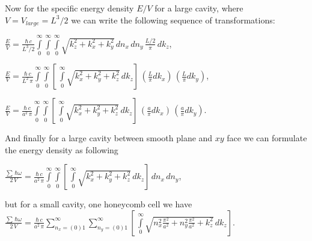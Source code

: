 \documentclass[twoside, 10pt, ptm]{article}
\begin{document}
\begin{multicols}{2}
    Now for the specific energy density \(E/V\) for a large cavity, where
\(V = V_{large} = L^3/2\) we can write the following sequence of transformations:

\noindent
    \(\frac{E}{V} = \frac{\hbar\,c}{L^3/2}\int\limits_{0}^{\infty}\int\limits_{0}^{\infty}\int\limits_{0}^{\infty}\sqrt{k_z^2+k_x^2+k_y^2}\,dn_x\,dn_y\,\frac{L/2}{\pi}\,dk_z\),


\noindent
    \(\frac{E}{V} = \frac{\hbar\,c}{L^2\,\pi}\int\limits_{0}^{\infty}\int\limits_{0}^{\infty}\left[\,\int\limits_{0}^{\infty}\sqrt{k_x^2+k_y^2+k_z^2}\,dk_z\right]\,\left(\frac{L}{\pi}dk_x\right)\,\left(\frac{L}{\pi}dk_y\right)\),

\noindent
    \(\frac{E}{V} = \frac{\hbar\,c}{a^2\,\pi}\int\limits_{0}^{\infty}\int\limits_{0}^{\infty}\left[\,\int\limits_{0}^{\infty}\sqrt{k_x^2+k_y^2+k_z^2}\,dk_z\right]\,\left(\frac{a}{\pi}dk_x\right)\,\left(\frac{a}{\pi}dk_y\right)\).

And finally for a large cavity between smooth plane and \(xy\) face we can formulate the energy density as following

    \(\frac{\sum\,\hbar\omega}{2\,V} = \frac{\hbar\,c}{a^2\,\pi}\int\limits_{0}^{\infty}\int\limits_{0}^{\infty}\left[\,\int\limits_{0}^{\infty}\sqrt{k_x^2+k_y^2+k_z^2}\,dk_z\right]\,dn_x\,dn_y\),

but for a small cavity, one honeycomb cell we have
\noindent
    \(\frac{\sum\,\hbar\omega}{2\,V} = \frac{\hbar\,c}{a^2\,\pi}\sum\limits_{n_x=(0)1}^{\infty}\sum\limits_{n_y=(0)1}^{\infty}\left[\,\int\limits_{0}^{\infty}\sqrt{n_x^2\frac{\pi^2}{a^2}+n_y^2\frac{\pi^2}{a^2}+k_z^2}\,dk_z\right]\).




\end{multicols}
\end{document}
